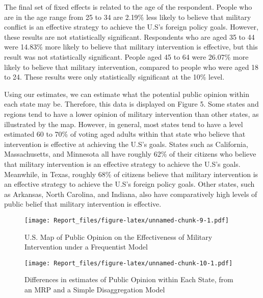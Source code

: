\documentclass[
  11pt,
]{article}
\begin{document}
The final set of fixed effects is related to the age of the respondent.
People who are in the age range from 25 to 34 are 2.19\% less likely to
believe that military conflict is an effective strategy to achieve the
U.S's foreign policy goals. However, these results are not statistically
significant. Respondents who are aged 35 to 44 were 14.83\% more likely
to believe that military intervention is effective, but this result was
not statistically significant. People aged 45 to 64 were 26.07\% more
likely to believe that military intervention, compared to people who
were aged 18 to 24. These results were only statistically significant at
the 10\% level.

Using our estimates, we can estimate what the potential public opinion
within each state may be. Therefore, this data is displayed on Figure 5.
Some states and regions tend to have a lower opinion of military
intervention than other states, as illustrated by the map. However, in
general, most states tend to have a level estimated 60 to 70\% of voting
aged adults within that state who believe that intervention is effective
at achieving the U.S's goals. States such as California, Massachusetts,
and Minnesota all have roughly 62\% of their citizens who believe that
military intervention is an effective strategy to achieve the U.S's
goals. Meanwhile, in Texas, roughly 68\% of citizens believe that
military intervention is an effective strategy to achieve the U.S's
foreign policy goals. Other states, such as Arkansas, North Carolina,
and Indiana, also have comparatively high levels of public belief that
military intervention is effective.

\begin{figure}
\centering
\texttt{[image: Report\_files/figure-latex/unnamed-chunk-9-1.pdf]}
\caption{U.S. Map of Public Opinion on the Effectiveness of Military
Intervention under a Frequentist Model}
\end{figure}

\begin{figure}
\centering
\texttt{[image: Report\_files/figure-latex/unnamed-chunk-10-1.pdf]}
\caption{Differences in estimates of Public Opinion within Each State,
from an MRP and a Simple Disaggregation Model}
\end{figure}
\end{document}
